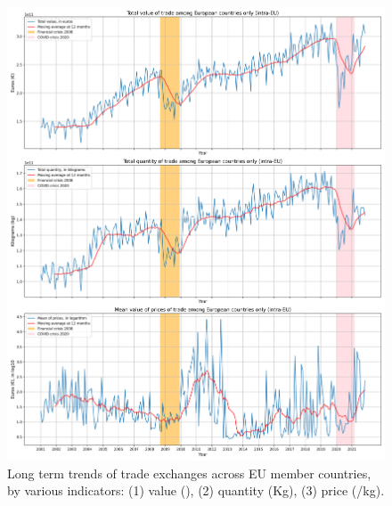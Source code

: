 \begin{figure}
    \centering
    \includegraphics[width=\textwidth]{pics/TOTAL_VQP_INTRA.png}
    \caption[Long term trends of trade exchanges across EU member countries]{Long term trends of trade exchanges across EU member countries, by various indicators: (1) value (\texteuro), (2) quantity (Kg), (3) price (\texteuro/kg).}
    \label{fig:totaleu}
\end{figure}

